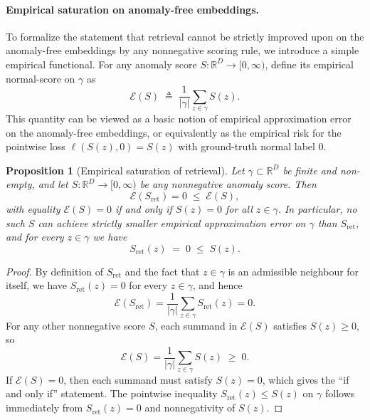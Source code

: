 \documentclass{article}
\theoremstyle{plain}
\newtheorem{proposition}[theorem]{Proposition}
\theoremstyle{definition}
\theoremstyle{remark}
\begin{document}
\paragraph{Empirical saturation on anomaly-free embeddings.}
To formalize the statement that retrieval cannot be strictly improved
upon on the anomaly-free embeddings by any nonnegative scoring rule, we
introduce a simple empirical functional. For any anomaly score
$S:\mathbb{R}^D\to [0,\infty)$, define its empirical normal-score on
$\gamma$ as
\begin{equation}
    \mathcal{E}(S)
    \;\triangleq\;
    \frac{1}{|\gamma|}
    \sum_{z\in\gamma} S(z).
\end{equation}
This quantity can be viewed as a basic notion of empirical
approximation error on the anomaly-free embeddings, or equivalently as
the empirical risk for the pointwise loss $\ell(S(z),0) = S(z)$ with
ground-truth normal label $0$.

\begin{proposition}[Empirical saturation of retrieval]
\label{prop:retrieval-optimal}
Let $\gamma\subset\mathbb{R}^D$ be finite and non-empty, and let
$S:\mathbb{R}^D\to[0,\infty)$ be any nonnegative anomaly score.
Then
\begin{equation}
    \mathcal{E}(S_{\mathrm{ret}})
    = 0
    \;\le\;
    \mathcal{E}(S),
\end{equation}
with equality $\mathcal{E}(S) = 0$ if and only if
$S(z) = 0$ for all $z\in\gamma$.
In particular, no such $S$ can achieve strictly smaller empirical
approximation error on $\gamma$ than $S_{\mathrm{ret}}$, and for every
$z\in\gamma$ we have
\begin{equation}
    S_{\mathrm{ret}}(z)
    \;=\; 0
    \;\le\;
    S(z).
\end{equation}
\end{proposition}

\begin{proof}
By definition of $S_{\mathrm{ret}}$ and the fact that
$z\in\gamma$ is an admissible neighbour for itself, we have
$S_{\mathrm{ret}}(z)=0$ for every $z\in\gamma$, and hence
\begin{equation}
    \mathcal{E}(S_{\mathrm{ret}})
    = \frac{1}{|\gamma|}
      \sum_{z\in\gamma} S_{\mathrm{ret}}(z)
    = 0.
\end{equation}
For any other nonnegative score $S$, each summand in $\mathcal{E}(S)$
satisfies $S(z)\ge 0$, so
\begin{equation}
    \mathcal{E}(S)
    = \frac{1}{|\gamma|}
      \sum_{z\in\gamma} S(z)
    \;\ge\; 0.
\end{equation}
If $\mathcal{E}(S) = 0$, then each summand must satisfy $S(z)=0$, which
gives the “if and only if” statement. The pointwise inequality
$S_{\mathrm{ret}}(z)\le S(z)$ on $\gamma$ follows immediately from
$S_{\mathrm{ret}}(z)=0$ and nonnegativity of $S(z)$.
\end{proof}
\end{document}
